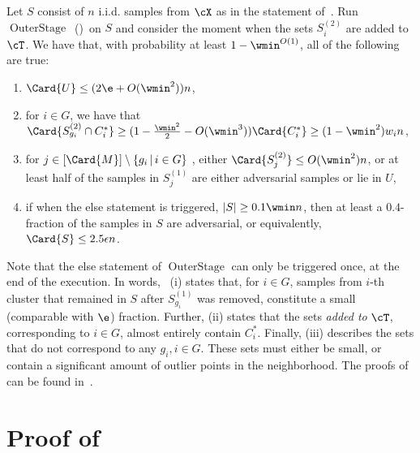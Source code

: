\begin{theorem}
\label{thm:outer_stage_guarantees}
Let \(S\) consist of \(n\) i.i.d. samples from \(\cX\) as in the statement of~. Run~\(\operatorname{OuterStage}\)~()~on \(S\) and consider the moment when the sets \(S_i^{(2)}\) are added to \(\cT\).
     We have that, with probability at least \(1 - \wmin^{O(1)}\), all of the following are true: 
     \begin{enumerate}[label=(\roman*),ref={\theassumption~(\roman*)}]
             \item \label{item:outer_stage_U_small}\(\Card{U} \leq (2\e + O(\wmin^2))n\),
        \item \label{item:outer_stage_S_gi} for \(i \in G\), we have that \(\Card{S_{g_i}^{(2)} \cap C^*_i} \geq (1 - \frac{\wmin^2}{2} - O(\wmin^3)) \Card{C^*_i} \geq (1 - \wmin^2) w_i n\),

        \item \label{item:outer_stage_not_S_gi_small}for \(j \in [\Card{M}] \setminus \{g_i\, |\, i \in G\}\) 
        , either \(\Card{S_j^{(2)}} \leq O(\wmin^2) n\), or at least half of the samples in \(S_j^{(1)}\) are either adversarial samples or lie in \(U\), 
        \item \label{item:outer_stage_else}
        if when the else statement is triggered,
        $|S| \geq 0.1 \wmin n$, then at least a $0.4$-fraction of the samples in $S$ are adversarial, or equivalently, $\Card{S} \leq 2.5 \epsilon n$.
     \end{enumerate}
\end{theorem}
Note that the else statement of \(\operatorname{OuterStage}\) can only be triggered once, at the end of the execution.
In words,~ (i) states that, for \(i \in G\), samples from \(i\)-th cluster that remained in \(S\) after \(S_{g_i}^{(1)}\) was removed, constitute a small (comparable with \(\e\)) fraction. Further, (ii) states that the sets \emph{added to} \(\cT\), corresponding to \(i \in G\), almost entirely contain \(C_i^*\). Finally, (iii) describes the sets that do not correspond to any \(g_i, i \in G\). These sets must either be small, or contain a significant amount of outlier points in the neighborhood.
The proofs of~ can be found in~.

\section{Proof of~}
\label{sec:main_result_appendix}

